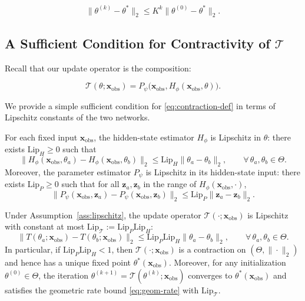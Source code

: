 \begin{equation}
\label{eq:geom-rate}
    \|\theta^{(k)}-\theta^*\|_2 \le K^k\|\theta^{(0)}-\theta^*\|_2.
\end{equation}

\subsection{A Sufficient Condition for Contractivity of $\mathcal{T}$}
\label{subsec:contractivity}

Recall that our update operator is the composition:

\begin{equation}
\label{eq:T-repeat}
    \mathcal{T}(\theta;\mathbf{x}_\mathrm{obs}) = P_\psi\big(\mathbf{x}_\mathrm{obs}, H_\phi(\mathbf{x}_\mathrm{obs},\theta)\big).
\end{equation}

We provide a simple sufficient condition for \eqref{eq:contraction-def} in terms of Lipschitz constants of the two networks.

\begin{assumption}
\label{ass:lipschitz}
    For each fixed input $\mathbf{x}_\mathrm{obs}$, the hidden-state estimator $H_\phi$ is Lipschitz in $\theta$:
    there exists $\mathrm{Lip}_H\ge0$ such that
    $$
    \lVert H_\phi(\mathbf{x}_\mathrm{obs},\theta_a)-H_\phi(\mathbf{x}_\mathrm{obs},\theta_b)\rVert_2 \le 
    \mathrm{Lip}_H\|\theta_a-\theta_b\|_2,
    \qquad \forall\,\theta_a,\theta_b\in\Theta.
    $$
    Moreover, the parameter estimator $P_\psi$ is Lipschitz in its hidden-state input:
    there exists $\mathrm{Lip}_P\ge0$ such that for all $\mathbf{z}_a,\mathbf{z}_b$ in the range of $H_\phi(\mathbf{x}_\mathrm{obs},\cdot)$,
    $$
    \lVert P_\psi(\mathbf{x}_\mathrm{obs},\mathbf{z}_a)-P_\psi(\mathbf{x}_\mathrm{obs},\mathbf{z}_b)\|_2 \le \mathrm{Lip}_P\|\mathbf{z}_a-\mathbf{z}_b\|_2.
    $$
\end{assumption}

\begin{theorem}
\label{thm:contraction}
    Under Assumption~\ref{ass:lipschitz}, the update operator $\mathcal{T}(\cdot;\mathbf{x}_\mathrm{obs})$ is Lipschitz with constant at most $\mathrm{Lip}_\mathcal{T}:=\mathrm{Lip}_P\mathrm{Lip}_H$:
    $$
    \|T(\theta_a;\mathbf{x}_\mathrm{obs})-T(\theta_b;\mathbf{x}_\mathrm{obs})\|_2 \le \mathrm{Lip}_P\mathrm{Lip}_H \|\theta_a-\theta_b\|_2,
    \qquad \forall\,\theta_a,\theta_b\in\Theta.
    $$
    In particular, if $\mathrm{Lip}_P\mathrm{Lip}_H<1$, then $\mathcal{T}(\cdot;\mathbf{x}_\mathrm{obs})$ is a contraction on $(\Theta,\|\cdot\|_2)$ and hence has a unique fixed point
    $\theta^*(\mathbf{x}_\mathrm{obs})$.
    Moreover, for any initialization $\theta^{(0)}\in\Theta$, the iteration $\theta^{(k+1)}=\mathcal{T}(\theta^{(k)};\mathbf{x}_\mathrm{obs})$ converges to
    $\theta^*(\mathbf{x}_\mathrm{obs})$ and satisfies the geometric rate bound \eqref{eq:geom-rate} with $\mathrm{Lip}_\mathcal{T}$.
\end{theorem}

